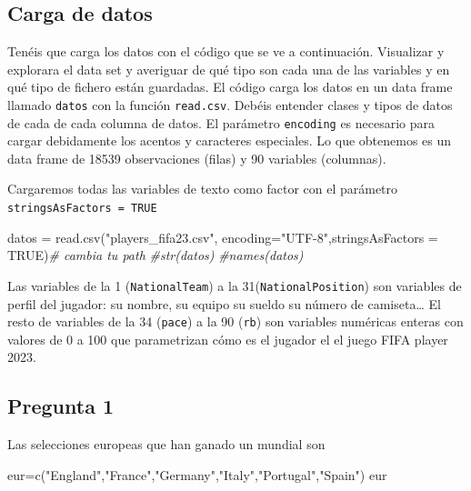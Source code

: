 \documentclass[
]{article}
\newenvironment{Shaded}{\begin{snugshade}}{\end{snugshade}}
\newcommand{\AttributeTok}[1]{\textcolor[rgb]{0.77,0.63,0.00}{#1}}
\newcommand{\CommentTok}[1]{\textcolor[rgb]{0.56,0.35,0.01}{\textit{#1}}}
\newcommand{\ConstantTok}[1]{\textcolor[rgb]{0.00,0.00,0.00}{#1}}
\newcommand{\FunctionTok}[1]{\textcolor[rgb]{0.00,0.00,0.00}{#1}}
\newcommand{\NormalTok}[1]{#1}
\newcommand{\OtherTok}[1]{\textcolor[rgb]{0.56,0.35,0.01}{#1}}
\newcommand{\StringTok}[1]{\textcolor[rgb]{0.31,0.60,0.02}{#1}}
\begin{document}
\hypertarget{carga-de-datos}{%
\subsection{Carga de datos}\label{carga-de-datos}}

Tenéis que carga los datos con el código que se ve a continuación.
Visualizar y explorara el data set y averiguar de qué tipo son cada una
de las variables y en qué tipo de fichero están guardadas. El código
carga los datos en un data frame llamado \texttt{datos} con la función
\texttt{read.csv}. Debéis entender clases y tipos de datos de cada de
cada columna de datos. El parámetro \texttt{encoding} es necesario para
cargar debidamente los acentos y caracteres especiales. Lo que obtenemos
es un data frame de 18539 observaciones (filas) y 90 variables
(columnas).

Cargaremos todas las variables de texto como factor con el parámetro
\texttt{stringsAsFactors\ =\ TRUE}

\begin{Shaded}
\begin{Highlighting}[]
\NormalTok{datos }\OtherTok{=} \FunctionTok{read.csv}\NormalTok{(}\StringTok{"players\_fifa23.csv"}\NormalTok{,}
  \AttributeTok{encoding=}\StringTok{"UTF{-}8"}\NormalTok{,}\AttributeTok{stringsAsFactors =} \ConstantTok{TRUE}\NormalTok{)}\CommentTok{\# cambia tu path}
\CommentTok{\#str(datos)}
\CommentTok{\#names(datos)}
\end{Highlighting}
\end{Shaded}

Las variables de la 1 (\texttt{NationalTeam}) a la
31(\texttt{NationalPosition}) son variables de perfil del jugador: su
nombre, su equipo su sueldo su número de camiseta\ldots{} El resto de
variables de la 34 (\texttt{pace}) a la 90 (\texttt{rb}) son variables
numéricas enteras con valores de 0 a 100 que parametrizan cómo es el
jugador el el juego FIFA player 2023.

\hypertarget{pregunta-1}{%
\subsection{Pregunta 1}\label{pregunta-1}}

Las selecciones europeas que han ganado un mundial son

\begin{Shaded}
\begin{Highlighting}[]
\NormalTok{eur}\OtherTok{=}\FunctionTok{c}\NormalTok{(}\StringTok{"England"}\NormalTok{,}\StringTok{"France"}\NormalTok{,}\StringTok{"Germany"}\NormalTok{,}\StringTok{"Italy"}\NormalTok{,}\StringTok{"Portugal"}\NormalTok{,}\StringTok{"Spain"}\NormalTok{)}
\NormalTok{eur}
\end{Highlighting}
\end{Shaded}
\end{document}
